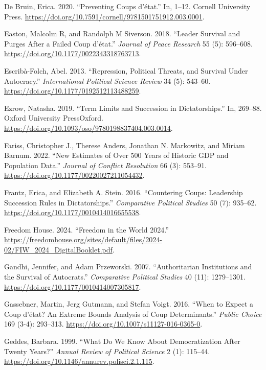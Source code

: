 \documentclass[
  12pt,
]{report}
\newlength{\cslhangindent}
\newenvironment{CSLReferences}[2] %
 {\begin{list}{}{%
  \setlength{\itemindent}{0pt}
  \setlength{\leftmargin}{0pt}
  \setlength{\parsep}{0pt}
  \ifodd #1
   \setlength{\leftmargin}{\cslhangindent}
   \setlength{\itemindent}{-1\cslhangindent}
  \fi
  \setlength{\itemsep}{#2\baselineskip}}}
 {\end{list}}
\begin{document}
\begin{CSLReferences}{1}{0}
De Bruin, Erica. 2020. {``Preventing Coups d{'}état.''} In, 1--12.
Cornell University Press.
\url{https://doi.org/10.7591/cornell/9781501751912.003.0001}.

Easton, Malcolm R, and Randolph M Siverson. 2018. {``Leader Survival and
Purges After a Failed Coup d{'}état.''} \emph{Journal of Peace Research}
55 (5): 596--608. \url{https://doi.org/10.1177/0022343318763713}.

Escribà-Folch, Abel. 2013. {``Repression, Political Threats, and
Survival Under Autocracy.''} \emph{International Political Science
Review} 34 (5): 543--60. \url{https://doi.org/10.1177/0192512113488259}.

Ezrow, Natasha. 2019. {``Term Limits and Succession in Dictatorships.''}
In, 269--88. Oxford University PressOxford.
\url{https://doi.org/10.1093/oso/9780198837404.003.0014}.

Fariss, Christopher J., Therese Anders, Jonathan N. Markowitz, and
Miriam Barnum. 2022. {``New Estimates of Over 500 Years of Historic GDP
and Population Data.''} \emph{Journal of Conflict Resolution} 66 (3):
553--91. \url{https://doi.org/10.1177/00220027211054432}.

Frantz, Erica, and Elizabeth A. Stein. 2016. {``Countering Coups:
Leadership Succession Rules in Dictatorships.''} \emph{Comparative
Political Studies} 50 (7): 935--62.
\url{https://doi.org/10.1177/0010414016655538}.

Freedom House. 2024. {``Freedom in the World 2024.''}
\url{https://freedomhouse.org/sites/default/files/2024-02/FIW_2024_DigitalBooklet.pdf}.

Gandhi, Jennifer, and Adam Przeworski. 2007. {``Authoritarian
Institutions and the Survival of Autocrats.''} \emph{Comparative
Political Studies} 40 (11): 1279--1301.
\url{https://doi.org/10.1177/0010414007305817}.

Gassebner, Martin, Jerg Gutmann, and Stefan Voigt. 2016. {``When to
Expect a Coup d{'}état? An Extreme Bounds Analysis of Coup
Determinants.''} \emph{Public Choice} 169 (3-4): 293--313.
\url{https://doi.org/10.1007/s11127-016-0365-0}.

Geddes, Barbara. 1999. {``What Do We Know About Democratization After
Twenty Years?''} \emph{Annual Review of Political Science} 2 (1):
115--44. \url{https://doi.org/10.1146/annurev.polisci.2.1.115}.


\end{CSLReferences}
\end{document}
